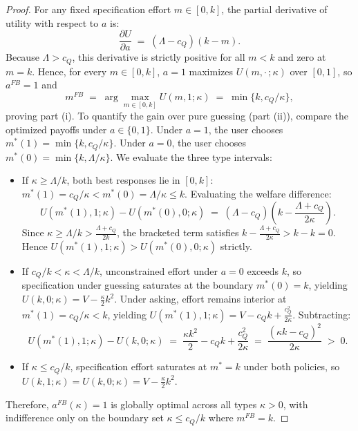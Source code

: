 \documentclass[11pt]{article}
\begin{document}
\begin{proof}
For any fixed specification effort $m \in [0, k]$, the partial derivative of utility with respect to $a$ is:
\[
\frac{\partial U}{\partial a} \;=\; (\Lambda - c_Q)(k - m).
\]
Because $\Lambda > c_Q$, this derivative is strictly positive for all $m < k$ and zero at $m = k$. Hence, for every $m \in [0,k]$, $a = 1$ maximizes $U(m,\cdot\,;\kappa)$ over $[0,1]$, so $a^{FB} = 1$ and
\[
m^{FB} \;=\; \arg\max_{m\in[0,k]} U(m,1;\kappa) \;=\; \min\{k, c_Q/\kappa\},
\]
proving part (i).
To quantify the gain over pure guessing (part (ii)), compare the optimized payoffs under $a \in \{0, 1\}$.
Under $a = 1$, the user chooses $m^*(1) = \min\{k, c_Q/\kappa\}$.
Under $a = 0$, the user chooses $m^*(0) = \min\{k, \Lambda/\kappa\}$.
We evaluate the three type intervals:
\begin{itemize}[leftmargin=*]
\item If $\kappa \ge \Lambda/k$, both best responses lie in $[0,k]$: $m^*(1) = c_Q/\kappa < m^*(0) = \Lambda/\kappa \le k$. Evaluating the welfare difference:
\[
U(m^*(1), 1; \kappa) - U(m^*(0), 0; \kappa) \;=\; (\Lambda - c_Q)\left( k - \frac{\Lambda + c_Q}{2\kappa} \right).
\]
Since $\kappa \ge \Lambda/k > \frac{\Lambda + c_Q}{2k}$, the bracketed term satisfies $k - \frac{\Lambda + c_Q}{2\kappa} > k - k = 0$. Hence $U(m^*(1), 1; \kappa) > U(m^*(0), 0; \kappa)$ strictly.
\item If $c_Q/k < \kappa < \Lambda/k$, unconstrained effort under $a = 0$ exceeds $k$, so specification under guessing saturates at the boundary $m^*(0) = k$, yielding $U(k, 0; \kappa) = V - \frac{\kappa}{2}k^2$. Under asking, effort remains interior at $m^*(1) = c_Q/\kappa < k$, yielding $U(m^*(1), 1; \kappa) = V - c_Q k + \frac{c_Q^2}{2\kappa}$. Subtracting:
\[
U(m^*(1), 1; \kappa) - U(k, 0; \kappa) \;=\; \frac{\kappa k^2}{2} - c_Q k + \frac{c_Q^2}{2\kappa} \;=\; \frac{(\kappa k - c_Q)^2}{2\kappa} \;>\; 0.
\]
\item If $\kappa \le c_Q/k$, specification effort saturates at $m^* = k$ under both policies, so $U(k, 1; \kappa) = U(k, 0; \kappa) = V - \frac{\kappa}{2}k^2$.
\end{itemize}
Therefore, $a^{FB}(\kappa) = 1$ is globally optimal across all types $\kappa > 0$, with indifference only on the boundary set $\kappa \le c_Q/k$ where $m^{FB} = k$.
\end{proof}
\end{document}
